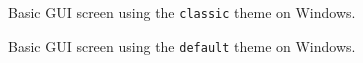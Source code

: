 \documentclass[a4paper]{article}
\begin{document}
\begin{figure}
\label{hercules-gui-basicscreen-classic}
\noindent{}
\caption{Basic GUI screen using the \texttt{classic} theme on Windows.}
\end{figure}
\begin{figure}
\label{hercules-gui-basicscreen-default}
\noindent{}
\caption{Basic GUI screen using the \texttt{default} theme on Windows.}
\end{figure}
\end{document}
